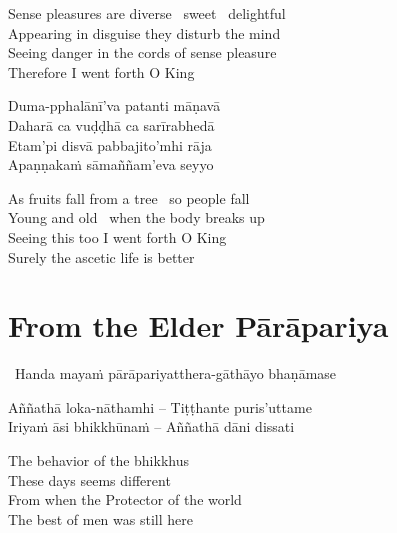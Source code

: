 \begin{english-verses}
  Sense pleasures are diverse \breathmark\ sweet \breathmark\ delightful\\
  Appearing in disguise they disturb the mind\\
  Seeing danger in the cords of sense pleasure\\
  Therefore I went forth O King
\end{english-verses}

\begin{verses}
  Duma-pphalānī'va patanti māṇavā\\
  Daharā ca vuḍḍhā ca sarīrabhedā\\
  Etam'pi disvā pabbajito'mhi rāja\\
  Apaṇṇakaṁ sāmaññam'eva seyyo
\end{verses}

\begin{english-verses}
  As fruits fall from a tree \breathmark\ so people fall\\
  Young and old \breathmark\ when the body breaks up\\
  Seeing this too I went forth O King\\
  Surely the ascetic life is better
\end{english-verses}

\suttaRef{[Thag 16.4 / MN 82]}




\section{From the Elder Pārāpariya}
\label{parapariya}

\begin{leader}
  \anglebracketleft\ \hspace{-0.5mm}Handa mayaṁ pārāpariyatthera-gāthāyo bhaṇāmase \hspace{-0.5mm}\anglebracketright\
\end{leader}

\begin{verses}
  Aññathā loka-nāthamhi – Tiṭṭhante puris'uttame\\
  Iriyaṁ āsi bhikkhūnaṁ – Aññathā dāni dissati
\end{verses}

\begin{english-verses}
  The behavior of the bhikkhus\\
  These days seems different\\
  From when the Protector of the world\\
  The best of men was still here
\end{english-verses}

